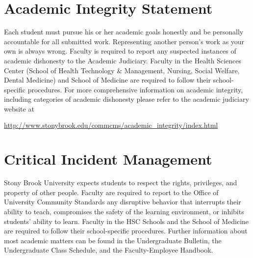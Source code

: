 \documentclass[11pt]{amsart}
\numberwithin{equation}{section}
\begin{document}
\section{Academic Integrity Statement}

Each student must pursue his or her academic goals honestly and be personally accountable for all submitted work. Representing another person's work as your own is always wrong. Faculty is required to report any suspected instances of academic dishonesty to the Academic Judiciary. Faculty in the Health Sciences Center (School of Health Technology \& Management, Nursing, Social Welfare, Dental Medicine) and School of Medicine are required to follow their school-specific procedures. For more comprehensive information on academic integrity, including categories of academic dishonesty please refer to the academic judiciary website at
\begin{center}
\url{http://www.stonybrook.edu/commcms/academic_integrity/index.html}
\end{center}

\section{Critical Incident Management}

Stony Brook University expects students to respect the rights, privileges, and property of other people. Faculty are required to report to the Office of University Community Standards any disruptive behavior that interrupts their ability to teach, compromises the safety of the learning environment, or inhibits students' ability to learn. Faculty in the HSC Schools and the School of Medicine are required to follow their school-specific procedures. Further information about most academic matters can be found in the Undergraduate Bulletin, the Undergraduate Class Schedule, and the Faculty-Employee Handbook.
\end{document}
